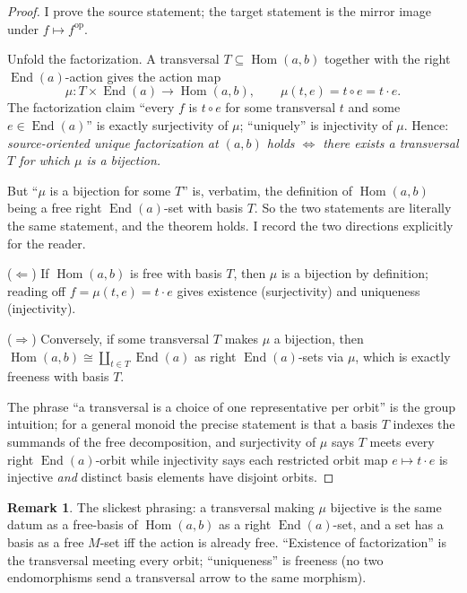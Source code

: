 \documentclass[11pt]{article}
\theoremstyle{definition}
\newtheorem{remark}[theorem]{Remark}
\newcommand{\Hom}{\operatorname{Hom}}
\newcommand{\End}{\operatorname{End}}
\begin{document}
\begin{proof}
I prove the source statement; the target statement is the mirror image under
$f \mapsto f^{\mathrm{op}}$.

Unfold the factorization. A transversal $T \subseteq \Hom(a,b)$ together with
the right $\End(a)$-action gives the action map
\[
  \mu : T \times \End(a) \longrightarrow \Hom(a,b), \qquad
  \mu(t,e) = t \circ e = t \cdot e.
\]
The factorization claim ``every $f$ is $t \circ e$ for some transversal $t$ and
some $e \in \End(a)$'' is exactly surjectivity of $\mu$; ``uniquely'' is
injectivity of $\mu$. Hence: \emph{source-oriented unique factorization at
$(a,b)$ holds $\iff$ there exists a transversal $T$ for which $\mu$ is a
bijection.}

But ``$\mu$ is a bijection for some $T$'' is, verbatim, the definition of
$\Hom(a,b)$ being a free right $\End(a)$-set with basis $T$. So the two
statements are literally the same statement, and the theorem holds. I record the
two directions explicitly for the reader.

($\Leftarrow$) If $\Hom(a,b)$ is free with basis $T$, then $\mu$ is a bijection
by definition; reading off $f = \mu(t,e) = t \cdot e$ gives existence
(surjectivity) and uniqueness (injectivity).

($\Rightarrow$) Conversely, if some transversal $T$ makes $\mu$ a bijection,
then $\Hom(a,b) \cong \coprod_{t \in T}\End(a)$ as right $\End(a)$-sets via
$\mu$, which is exactly freeness with basis $T$.

The phrase ``a transversal is a choice of one representative per orbit'' is the
group intuition; for a general monoid the precise statement is that a basis $T$
indexes the summands of the free decomposition, and surjectivity of $\mu$ says
$T$ meets every right $\End(a)$-orbit while injectivity says each restricted
orbit map $e \mapsto t\cdot e$ is injective \emph{and} distinct basis elements
have disjoint orbits.
\end{proof}

\begin{remark}
The slickest phrasing: a transversal making $\mu$ bijective is the same datum as
a free-basis of $\Hom(a,b)$ as a right $\End(a)$-set, and a set has a basis as a
free $M$-set iff the action is already free. ``Existence of factorization'' is
the transversal meeting every orbit; ``uniqueness'' is freeness (no two
endomorphisms send a transversal arrow to the same morphism).
\end{remark}
\end{document}
